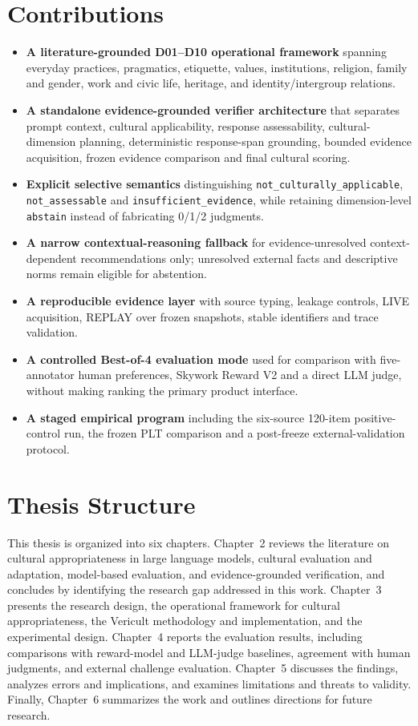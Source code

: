\section{Contributions}
\begin{itemize}
    \item \textbf{A literature-grounded D01--D10 operational framework} spanning everyday practices, pragmatics, etiquette, values, institutions, religion, family and gender, work and civic life, heritage, and identity/intergroup relations.
    \item \textbf{A standalone evidence-grounded verifier architecture} that separates prompt context, cultural applicability, response assessability, cultural-dimension planning, deterministic response-span grounding, bounded evidence acquisition, frozen evidence comparison and final cultural scoring.
    \item \textbf{Explicit selective semantics} distinguishing \texttt{not\_culturally\_applicable}, \texttt{not\_assessable} and \texttt{insufficient\_evidence}, while retaining dimension-level \texttt{abstain} instead of fabricating 0/1/2 judgments.
    \item \textbf{A narrow contextual-reasoning fallback} for evidence-unresolved context-dependent recommendations only; unresolved external facts and descriptive norms remain eligible for abstention.
    \item \textbf{A reproducible evidence layer} with source typing, leakage controls, LIVE acquisition, REPLAY over frozen snapshots, stable identifiers and trace validation.
    \item \textbf{A controlled Best-of-4 evaluation mode} used for comparison with five-annotator human preferences, Skywork Reward V2 and a direct LLM judge, without making ranking the primary product interface.
    \item \textbf{A staged empirical program} including the six-source 120-item positive-control run, the frozen PLT comparison and a post-freeze external-validation protocol.
\end{itemize}

\section{Thesis Structure}

This thesis is organized into six chapters. Chapter~2 reviews the literature on cultural appropriateness in large language models, cultural evaluation and adaptation, model-based evaluation, and evidence-grounded verification, and concludes by identifying the research gap addressed in this work. Chapter~3 presents the research design, the operational framework for cultural appropriateness, the Vericult methodology and implementation, and the experimental design. Chapter~4 reports the evaluation results, including comparisons with reward-model and LLM-judge baselines, agreement with human judgments, and external challenge evaluation. Chapter~5 discusses the findings, analyzes errors and implications, and examines limitations and threats to validity. Finally, Chapter~6 summarizes the work and outlines directions for future research.
